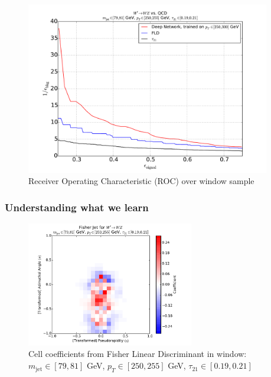 \begin{figure}[htbp]
  \centering
  \includegraphics[width=0.95\textwidth]{figures/augwindow-roc.pdf}
  \caption{Receiver Operating Characteristic (ROC) over window sample}
  \label{fig:rocWindow}
\end{figure}

\subsubsection{Understanding what we learn} %
\label{ssub:understanding_what_we_learn}

\begin{figure}[htbp]
  \centering
  \includegraphics[width=0.65\textwidth]{figures/fld-benwindow.pdf}
  \caption{Cell coefficients from Fisher Linear Discriminant in window: $m_\text{jet}\in [79, 81]$ GeV, $p_{T}\in [250, 255]$ GeV, $\tau_{21}\in[0.19, 0.21]$}
  \label{fig:fldWindow}
\end{figure}

